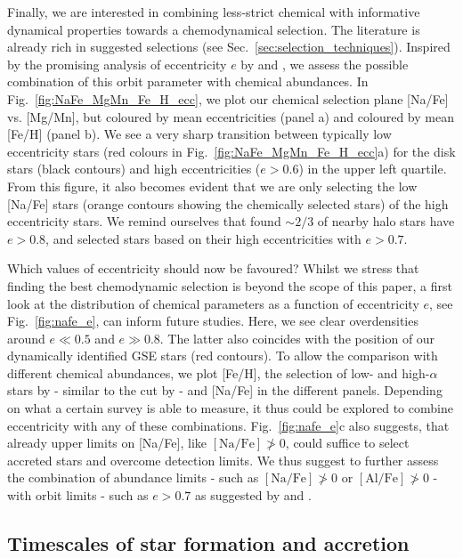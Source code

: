 \documentclass[fleqn,usenatbib]{mnras}
\begin{document}
Finally, we are interested in combining less-strict chemical with informative dynamical properties towards a chemodynamical selection. The literature is already rich in suggested selections (see Sec.~\ref{sec:selection_techniques}). Inspired by the promising analysis of eccentricity $e$ by \citet{Mackereth2019} and \citet{Naidu2020}, we assess the possible combination of this orbit parameter with chemical abundances. In Fig.~\ref{fig:NaFe_MgMn_Fe_H_ecc}, we plot our chemical selection plane [Na/Fe] vs. [Mg/Mn], but coloured by mean eccentricities (panel a) and coloured by mean [Fe/H] (panel b). We see a very sharp transition between typically low eccentricity stars (red colours in Fig.~\ref{fig:NaFe_MgMn_Fe_H_ecc}a) for the disk stars (black contours) and high eccentricities ($e > 0.6$) in the upper left quartile. From this figure, it also becomes evident that we are only selecting the low [Na/Fe] stars (orange contours showing the chemically selected stars) of the high eccentricity stars. We remind ourselves that \citet{Mackereth2019} found $\sim 2/3$ of nearby halo stars have $e > 0.8$, and \citet{Naidu2020} selected stars based on their high eccentricities with $e > 0.7$.

Which values of eccentricity should now be favoured? Whilst we stress that finding the best chemodynamic selection is beyond the scope of this paper, a first look at the distribution of chemical parameters as a function of eccentricity $e$, see Fig.~\ref{fig:nafe_e}, can inform future studies. Here, we see clear overdensities around $e \ll 0.5$ and $e \gg 0.8$. The latter also coincides with the position of our dynamically identified GSE stars (red contours). To allow the comparison with different chemical abundances, we plot [Fe/H], the selection of low- and high-$\alpha$ stars by \citet{Naidu2020} - similar to the cut by \citet{Nissen2010} - and [Na/Fe] in the different panels. Depending on what a certain survey is able to measure, it thus could be explored to combine eccentricity with any of these combinations. Fig.~\ref{fig:nafe_e}c also suggests, that already upper limits on [Na/Fe], like $\mathrm{[Na/Fe]} \not> 0$, could suffice to select accreted stars and overcome detection limits. We thus suggest to further assess the combination of abundance limits - such as $\mathrm{[Na/Fe]} \not> 0$ or $\mathrm{[Al/Fe]} \not> 0$ - with orbit limits - such as $e > 0.7$ as suggested by \citet{Mackereth2019} and \citet{Naidu2020}.

\subsection{Timescales of star formation and accretion} \label{sec:age_timescale}
\end{document}
